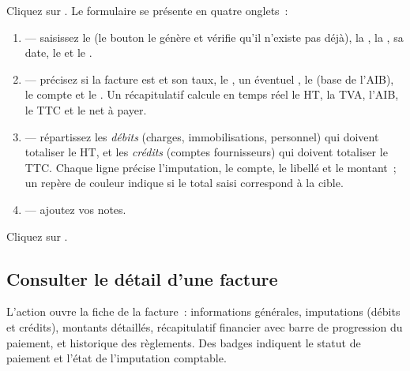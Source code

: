 Cliquez sur . Le formulaire se présente en quatre onglets~:

\begin{enumerate}
  \item {} — saisissez le  (le bouton  le génère et vérifie qu'il n'existe pas déjà), la , la , sa date, le  et le .
  \item {} — précisez si la facture est  et son taux, le , un éventuel , le  (base de l'AIB), le compte et le . Un récapitulatif calcule en temps réel le HT, la TVA, l'AIB, le TTC et le net à payer.
  \item {} — répartissez les \emph{débits} (charges, immobilisations, personnel) qui doivent totaliser le HT, et les \emph{crédits} (comptes fournisseurs) qui doivent totaliser le TTC. Chaque ligne précise l'imputation, le compte, le libellé et le montant~; un repère de couleur indique si le total saisi correspond à la cible.
  \item {} — ajoutez vos notes.
\end{enumerate}

Cliquez sur .



\subsection{Consulter le détail d'une facture}

L'action  ouvre la fiche de la facture~: informations générales, imputations (débits et crédits), montants détaillés, récapitulatif financier avec barre de progression du paiement, et historique des règlements. Des badges indiquent le statut de paiement et l'état de l'imputation comptable.


